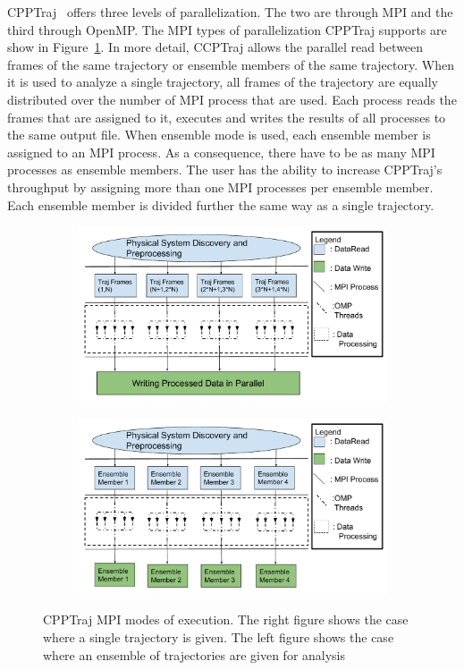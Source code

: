 CPPTraj~\cite{cpptraj-2013} offers three levels of parallelization. The two are through MPI and the third through OpenMP.
The MPI types of parallelization CPPTraj supports are show in Figure~\ref{fig:cpptraj_arch}. In more detail,
CCPTraj allows the parallel read between frames of the same trajectory or ensemble members of
the same trajectory. When it is used to analyze a single trajectory, all frames of the trajectory
are equally distributed over the number of MPI process that are used. Each process reads the frames
that are assigned to it, executes and writes the results of all processes to the same output file.
When ensemble mode is used, each ensemble member is assigned to an MPI process. As a consequence,
there have to be as many MPI processes as ensemble members. The user has the ability to increase 
CPPTraj's throughput by assigning more than one MPI processes per ensemble member. Each ensemble 
member is divided further the same way as a single trajectory.
\begin{figure}[ht!]
		\begin{subfigure}{.5\textwidth}
		\centering
		\includegraphics[width=.95\textwidth]{figures/CPPTrajExecutionSchematicSingleTrajectory.pdf}
	\end{subfigure}
	\begin{subfigure}{.5\textwidth}
		\centering
		\includegraphics[width=.95\linewidth]{figures/CPPTrajExecutionSchematicEnsembleTrajectories.pdf}
	\end{subfigure}
	\caption{CPPTraj MPI modes of execution. The right figure shows the case where a single trajectory is
		given. The left figure shows the case where an ensemble of trajectories are given for analysis}
	\label{fig:cpptraj_arch}
\end{figure}


